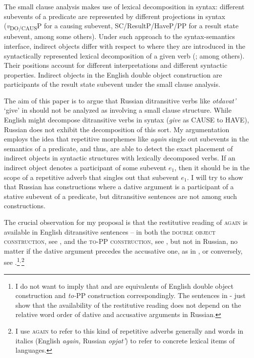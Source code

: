 \documentclass[output=paper]{langscibook}
\begin{document}
{The small clause analysis makes use of lexical decomposition in syntax: different subevents of a predicate are represented by different projections in syntax (}{\textit{v}}{\textsubscript{DO/CAUS}}{P for a causing subevent, SC\slash ResultP\slash HaveP\slash PP for a result state subevent, among some others). Under such approach to the syntax-semantics interface, indirect objects differ with respect to where they are introduced in the syntactically represented lexical decomposition of a given verb (\citealt{Cuervo2003,Schäfer2008}; among others). Their positions account for different interpretations and different syntactic properties. Indirect objects in the English double object construction are participants of the result state subevent under the small clause analysis.}



The aim of this paper is to argue that Russian ditransitive verbs like \textit{otdavat’} ‘give’ in  should not be analyzed as involving a small clause structure. While English might decompose ditransitive verbs in syntax (\textit{give} as CAUSE to HAVE), Russian does not exhibit the decomposition of this sort. My argumentation employs the idea that repetitive morphemes like \textit{again} single out subevents in the semantics of a predicate, and thus, are able to detect the exact placement of indirect objects in syntactic structures with lexically decomposed verbs. If an indirect object denotes a participant of some subevent $e_1$, then it should be in the scope of a repetitive adverb that singles out that subevent $e_1$. I will try to show that Russian has constructions where a dative argument is a participant of a stative subevent of a predicate, but ditransitive sentences are not among such constructions. 


\largerpage[-1]
The crucial observation for my proposal is that the restitutive reading of \textsc{again} is available in English ditransitive sentences -- in both the \textsc{double object construction}, see , and the \textsc{to-PP construction}, see , but not in Russian, no matter if the dative argument precedes the accusative one, as in , or conversely, see .\footnote{I do not want to imply that  and  are equivalents of English double object construction and \textit{to-}PP construction correspondingly. The sentences in - just show that the availability of the restitutive reading does not depend on the relative word order of dative and accusative arguments in Russian.}$^,$\footnote{I use \textsc{again} to refer to this kind of repetitive adverbs generally and words in italics (English \textit{again,} Russian \textit{opjat’}) to refer to concrete lexical items of languages.}
\end{document}
